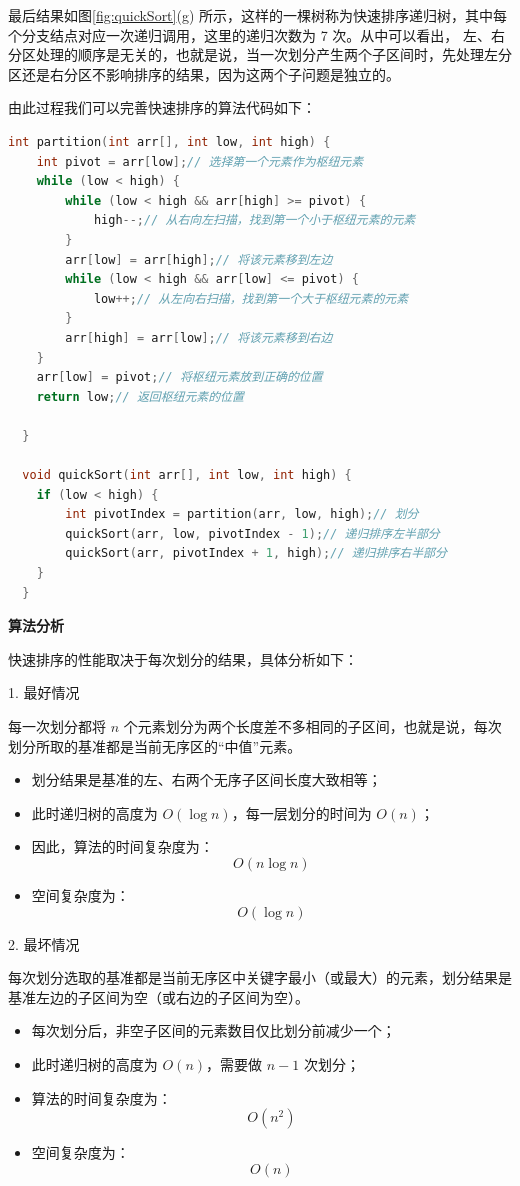 \documentclass[lang=cn,newtx,10pt,scheme=chinese]{../elegantbook}
\begin{document}
最后结果如图\ref{fig:quickSort}(g) 所示，这样的一棵树称为快速排序递归树，其中每个分支结点对应一次递归调用，这里的递归次数为 7 次。从中可以看出，
左、右分区处理的顺序是无关的，也就是说，当一次划分产生两个子区间时，先处理左分区还是右分区不影响排序的结果，因为这两个子问题是独立的。


由此过程我们可以完善快速排序的算法代码如下：

\begin{lstlisting}[language=C++, caption=快速排序的算法代码]
  int partition(int arr[], int low, int high) {
    int pivot = arr[low];// 选择第一个元素作为枢纽元素
    while (low < high) {
        while (low < high && arr[high] >= pivot) {
            high--;// 从右向左扫描，找到第一个小于枢纽元素的元素
        }
        arr[low] = arr[high];// 将该元素移到左边
        while (low < high && arr[low] <= pivot) {
            low++;// 从左向右扫描，找到第一个大于枢纽元素的元素
        }
        arr[high] = arr[low];// 将该元素移到右边
    }
    arr[low] = pivot;// 将枢纽元素放到正确的位置
    return low;// 返回枢纽元素的位置

  }

  void quickSort(int arr[], int low, int high) {
    if (low < high) {
        int pivotIndex = partition(arr, low, high);// 划分
        quickSort(arr, low, pivotIndex - 1);// 递归排序左半部分
        quickSort(arr, pivotIndex + 1, high);// 递归排序右半部分
    }
  }
\end{lstlisting}

\textbf{算法分析}

快速排序的性能取决于每次划分的结果，具体分析如下：

1. 最好情况  

   每一次划分都将 $n$ 个元素划分为两个长度差不多相同的子区间，也就是说，每次划分所取的基准都是当前无序区的“中值”元素。  
   \begin{itemize}
     \item 划分结果是基准的左、右两个无序子区间长度大致相等；
     \item 此时递归树的高度为 $O(\log n)$，每一层划分的时间为 $O(n)$；
     \item 因此，算法的时间复杂度为：
       \[
       O(n \log n)
       \]
     \item 空间复杂度为：
       \[
       O(\log n)
       \]
   \end{itemize}

2. 最坏情况  

   每次划分选取的基准都是当前无序区中关键字最小（或最大）的元素，划分结果是基准左边的子区间为空（或右边的子区间为空）。  
   \begin{itemize}
     \item 每次划分后，非空子区间的元素数目仅比划分前减少一个；
     \item 此时递归树的高度为 $O(n)$，需要做 $n-1$ 次划分；
     \item 算法的时间复杂度为：
       \[
       O(n^2)
       \]
     \item 空间复杂度为：
       \[
       O(n)
       \]
   \end{itemize}
\end{document}
